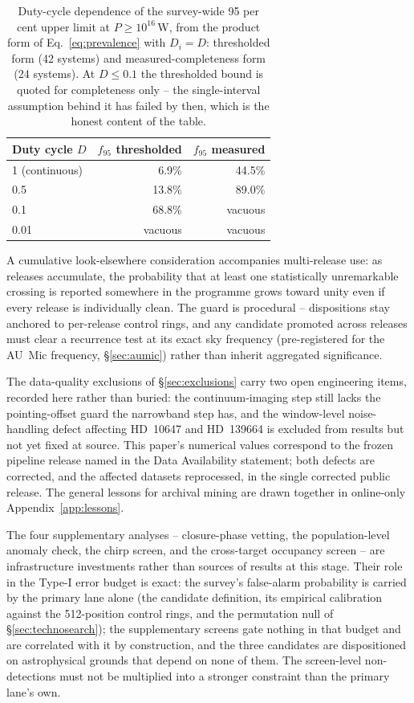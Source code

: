 \documentclass{openjournal}
\begin{document}
\begin{table}
\centering
\small
\caption{Duty-cycle dependence of the survey-wide 95 per cent upper
limit at $P\geq10^{16}$\,W, from the product form of
Eq.~\ref{eq:prevalence} with $D_i=D$: thresholded form (42 systems)
and measured-completeness form (24 systems). At $D\leq0.1$ the
thresholded bound is quoted for completeness only -- the
single-interval assumption behind it has failed by then, which is the
honest content of the table.}
\label{tab:f95duty}
\begin{tabular}{@{}lrr@{}}
\toprule
Duty cycle $D$ & $f_{95}$ thresholded & $f_{95}$ measured \\
\midrule
1 (continuous) & 6.9\% & 44.5\% \\
0.5 & 13.8\% & 89.0\% \\
0.1 & 68.8\% & vacuous \\
0.01 & vacuous & vacuous \\
\bottomrule
\end{tabular}
\end{table}

A cumulative look-elsewhere consideration accompanies multi-release
use: as releases accumulate, the probability that at least one
statistically unremarkable crossing is reported somewhere in the
programme grows toward unity even if every release is individually
clean. The guard is procedural -- dispositions stay anchored to
per-release control rings, and any candidate promoted across releases
must clear a recurrence test at its exact sky frequency
(pre-registered for the AU~Mic frequency, \S\ref{sec:aumic}) rather
than inherit aggregated significance.

The data-quality exclusions of \S\ref{sec:exclusions} carry two open
engineering items, recorded here rather than buried: the
continuum-imaging step still lacks the pointing-offset guard the
narrowband step has, and the window-level noise-handling defect
affecting HD~10647 and HD~139664 is excluded from results but not yet
fixed at source. This paper's numerical values correspond to the
frozen pipeline release named in the Data Availability statement;
both defects are corrected, and the affected datasets reprocessed, in
the single corrected public release. The general lessons for archival
mining are drawn together in online-only
Appendix~\ref{app:lessons}.

The four supplementary analyses -- closure-phase vetting, the
population-level anomaly check, the chirp screen, and the
cross-target occupancy screen -- are infrastructure investments
rather than sources of results at this stage. Their role in the
Type-I error budget is exact: the survey's false-alarm probability is
carried by the primary lane alone (the candidate definition, its
empirical calibration against the 512-position control rings, and the
permutation null of \S\ref{sec:technosearch}); the supplementary
screens gate nothing in that budget and are correlated with it by
construction, and the three candidates are dispositioned on
astrophysical grounds that depend on none of them. The screen-level
non-detections must not be multiplied into a stronger constraint than
the primary lane's own.
\end{document}
